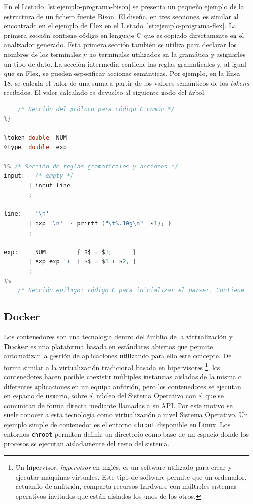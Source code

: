 

En el Listado \ref{lst:ejemplo-programa-bison} se presenta un pequeño ejemplo de la estructura de un fichero fuente Bison. El diseño, en tres secciones, es similar al encontrado en el ejemplo de Flex en el Listado \ref{lst:ejemplo-programa-flex}. La primera sección contiene código en lenguaje C que es copiado directamente en el analizador generado. Esta primera sección también se utiliza para declarar los nombres de los terminales y no terminales utilizados en la gramática y asignarles un tipo de dato. La sección intermedia contiene las reglas gramaticales y, al igual que en Flex, se pueden especificar acciones semánticas. Por ejemplo, en la línea 18, se calcula el valor de una suma a partir de los valores semánticos de los \emph{tokens} recibidos. El valor calculado es devuelto al siguiente nodo del árbol.

\begin{lstlisting}[language=C,caption={Ejemplo de programa Bison \cite{mit_web_bisonExample}},label=lst:ejemplo-programa-bison]
%{
    /* Sección del prólogo para código C común */
%}

%token double  NUM
%type  double  exp

%% /* Sección de reglas gramaticales y acciones */
input:   /* empty */
       | input line
       ;

line:    '\n'
       | exp '\n'  { printf ("\t%.10g\n", $1); }
       ;
    
exp:     NUM         { $$ = $1;      }
       | exp exp '+' { $$ = $1 + $2; }
       ;
%%
    /* Sección epílogo: código C para inicializar el parser. Contiene la función main() */
\end{lstlisting}

\subsection{Docker}

Los contenedores son una tecnología dentro del ámbito de la virtualización y \textbf{Docker} es una plataforma basada en estándares abiertos que permite automatizar la gestión de aplicaciones utilizando para ello este concepto. De forma similar a la virtualización tradicional basada en hipervisores \footnote{Un hipervisor, \emph{hypervisor} en inglés, es un software utilizado para crear y ejecutar máquinas virtuales. Este tipo de software permite que un ordenador, actuando de anfitrión, comparta recursos hardware con múltiples sistemas operativos invitados que están aislados los unos de los otros.}, los contenedores hacen posible coexistir múltiples instancias aisladas de la misma o diferentes aplicaciones en un  equipo anfitrión, pero los contenedores se ejecutan en espacio de usuario, sobre el núcleo del Sistema Operativo con el que se comunican de forma directa mediante llamadas a su API. Por este motivo se suele conocer a esta tecnología como virtualización a nivel Sistema Operativo. Un ejemplo simple de contenedor es el entorno \verb|chroot| disponible en Linux. Los entornos \verb|chroot| permiten definir un directorio como base de un espacio donde los procesos se ejecutan aisladamente del resto del sistema. 

